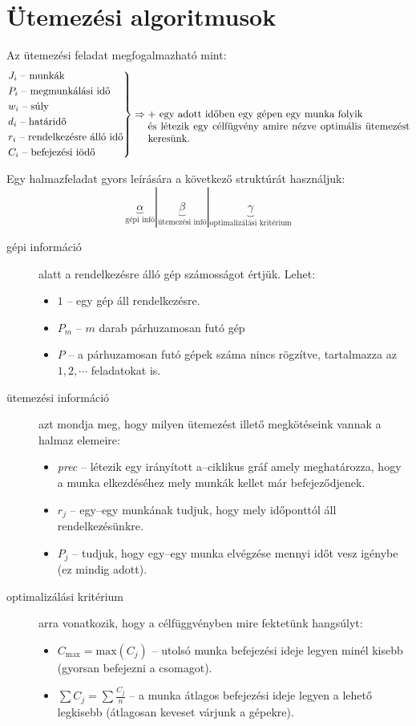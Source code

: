 \newpage
\section{Ütemezési algoritmusok}

Az ütemezési feladat megfogalmazható mint:
\[
\begin{rcases}
J_i \mbox{ -- munkák} \\
P_i \mbox{ -- megmunkálási idő} \\
w_i \mbox{ -- súly} \\
d_i \mbox{ -- határidő} \\
r_i \mbox{ -- rendelkezésre álló idő} \\
C_i \mbox{ -- befejezési iödő} \\
\end{rcases}
\Rightarrow 
\parbox[t]{9cm}{ $+$ egy adott időben egy gépen egy munka folyik \\
és létezik egy célfügvény amire nézve optimális ütemezést keresünk.}
\]

Egy halmazfeladat gyors leírására a következő struktúrát használjuk:
\[
\underbrace{\alpha}_{\mbox{gépi infó}} | \underbrace{\beta}_{\mbox{ütemezési infó}
} | \underbrace{\gamma}_{\mbox{optimalizálási kritérium}}
\]

\begin{description}
  \item[gépi információ] alatt a rendelkezésre álló gép számosságot értjük. Lehet:
  \begin{itemize}
  \item $1$ -- egy gép áll rendelkezésre.
  \item $P_m$ -- $m$ darab párhuzamosan futó gép
  \item $P$ -- a párhuzamosan futó gépek száma nincs rögzítve, tartalmazza az $1,2,\cdots$ feladatokat is.
\end{itemize}
  \item[ütemezési információ] azt mondja meg, hogy milyen ütemezést illető
  megkötéseink vannak a halmaz elemeire:
  \begin{itemize}
  \item \emph{prec} -- létezik egy irányított a--ciklikus gráf amely
  meghatározza, hogy a munka elkezdéséhez mely munkák kellet már befejeződjenek.
  \item $r_j$ -- egy--egy munkának tudjuk, hogy mely időponttól áll rendelkezésünkre.
  \item $P_j$ -- tudjuk, hogy egy--egy munka elvégzése mennyi időt vesz igénybe
  (ez mindig adott).
\end{itemize}
  \item[optimalizálási kritérium] arra vonatkozik, hogy a célfüggvényben mire
  fektetünk hangsúlyt:
  \begin{itemize}
  \item $C_{\mbox{max}}=\mbox{max}(C_j)$ -- utolsó munka befejezési ideje legyen minél
  kisebb (gyorsan befejezni a csomagot).
  \item $\sum C_j = \sum \frac{C_j}{n}$ -- a munka átlagos befejezési ideje
  legyen a lehető legkisebb (átlagosan keveset várjunk a gépekre).
\end{itemize}
\end{description} 

